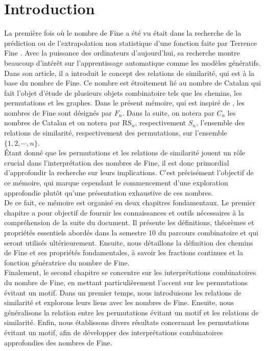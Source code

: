 \section*{Introduction}
\vspace*{20pt}
La première fois où le nombre de Fine a été vu était dans la recherche de la prédiction ou de l'extrapolation non statistique d'une fonction faite par Terrence Fine \cite{TFine}. Avec la puissance des ordinateurs d'aujourd'hui, sa recherche montre beaucoup d'intérêt sur l'apprentissage automatique comme les modèles génératifs. Dans son article, il a introduit le concept des relations de similarité, qui est à la base du nombre de Fine.
Ce nombre est étroitement lié au nombre de Catalan qui fait l'objet d'étude de plusieurs objets combinatoire tels que les chemins, les permutations et les graphes. Dans le présent mémoire, qui est inspiré de \cite{RRP}, les nombres de Fine sont désignés par $F_{n}$. Dans la suite, on notera par $C_{n}$ les nombres de Catalan et on notera par $\text{RS}_{n}$, respectivement $S_{n}$, l'ensemble des relations de similarité, respectivement des permutations, sur l'ensemble $\{1, 2, \cdots, n\}$.\vspace{5pt}\\

Étant donné que les permutations et les relations de similarité jouent un rôle crucial dans l'interprétation des nombres de Fine, il est donc primordial d'approfondir la recherche sur leurs implications. C'est précisément l'objectif de ce mémoire, qui marque cependant le commencement d'une exploration approfondie plutôt qu'une présentation exhaustive de ces nombres. \vspace{5pt}\\

De ce fait, ce mémoire est organisé en deux chapitres fondamentaux. Le premier chapitre a pour objectif de fournir les connaissances et outils nécessaires à la compréhension de la suite du document. Il présente les définitions, théorèmes et propriétés essentiels abordés dans la semestre $10$ du parcours combinatoire et qui seront utilisés ultérieurement. Ensuite, nous détaillons la définition des chemins de Fine et ses propriétés fondamentales, à savoir les fractions continues et la fonction génératrice du nombre de Fine. \vspace*{5pt}\\

Finalement, le second chapitre se concentre sur les interprétations combinatoires du nombre de Fine, en mettant particulièrement l'accent sur les permutations évitant un motif. Dans un premier temps, nous introduisons les relations de similarité et explorons leurs liens avec les nombres de Fine. Ensuite, nous généralisons la relation entre les permutations évitant un motif et les relations de similarité. Enfin, nous établissons divers résultats concernant les permutations évitant un motif, afin de développer des interprétations combinatoires approfondies des nombres de Fine.\\
\newpage

